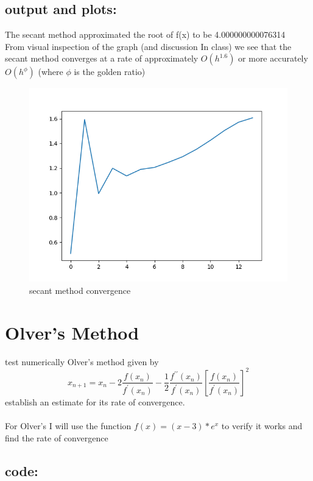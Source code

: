 \documentclass{article}
\begin{document}
\subsection*{output and plots:}
The secant method approximated the root of f(x) to be 4.000000000076314\\
From visual inspection of the graph (and discussion In class) we see that the secant method converges at a rate of approximately  $O(h^{1.6})$ or more accurately $O(h^{\phi})$ (where $\phi$ is the golden ratio)
	\begin{figure}[hbt!]
		\centering
		\includegraphics[width=.75\linewidth]{secant_alpha.png}
		\caption{secant method convergence}
		\label{fig: secant method convergence}
	\end{figure} 
	
	
\section{Olver's Method}
test numerically Olver's method given by
$$x_{n+1}= x_n - 2\frac{f(x_n)}{f^\prime(x_n)} - \frac{1}{2}\frac{f^{\prime\prime}(x_n)}{f^{\prime}(x_n)}\left[\frac{f(x_n)}{f^\prime(x_n)}\right]^2$$
establish an estimate for its rate of convergence.
\\\\
For Olver's I will use the function $f(x) = (x-3) * e^x$ to verify it works and find the rate of convergence
\subsection*{code:}

\end{document}
